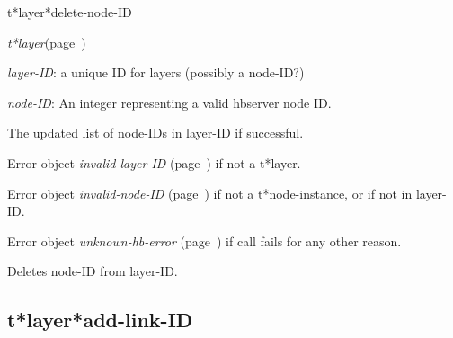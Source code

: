 \begin{description}
\item [Name:]  t*layer*delete-node-ID

\item [Class:] {\sl t*layer}\hfill(page~\pageref{t*layer})

\item [Parameters:]
\item {\sl layer-ID}:  a unique ID for layers (possibly a node-ID?)


\item {\sl node-ID}:   An integer representing
a valid hbserver node ID.


\item [Return-value:]
The updated list of node-IDs in layer-ID if successful.

Error object {\sl invalid-layer-ID} (page~\pageref{invalid-layer-ID}) if not a t*layer.

Error object {\sl invalid-node-ID} (page~\pageref{invalid-node-ID}) if not a
t*node-instance, or if not in layer-ID.

Error object {\sl unknown-hb-error} (page~\pageref{unknown-hb-error}) if call fails for
any other reason.

\item [Description:]

Deletes node-ID from layer-ID.

\item [Public:]



\end{description}
\horizontalline

\subsection{t*layer*add-link-ID}
\label{t*layer*add-link-ID}

